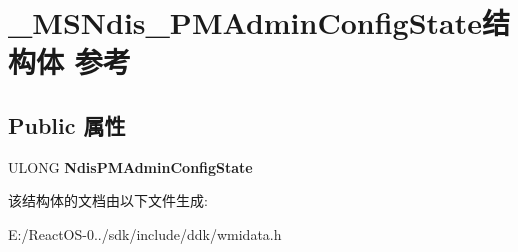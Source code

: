 \hypertarget{struct___m_s_ndis___p_m_admin_config_state}{}\section{\+\_\+\+M\+S\+Ndis\+\_\+\+P\+M\+Admin\+Config\+State结构体 参考}
\label{struct___m_s_ndis___p_m_admin_config_state}
\subsection*{Public 属性}
\begin{DoxyCompactItemize}
\item 
\mbox{\label{struct___m_s_ndis___p_m_admin_config_state_abb3c62b88cb729ed2fb754ad95492c1e}} 
U\+L\+O\+NG {\bfseries Ndis\+P\+M\+Admin\+Config\+State}
\end{DoxyCompactItemize}


该结构体的文档由以下文件生成\+:\begin{DoxyCompactItemize}
\item 
E\+:/\+React\+O\+S-\/0../sdk/include/ddk/wmidata.\+h\end{DoxyCompactItemize}
